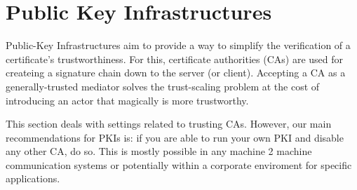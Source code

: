 \section{Public Key Infrastructures}

Public-Key Infrastructures aim to provide a way to simplify the verification of
a certificate's trustworthiness.  For this, certificate authorities (CAs) are
used for createing a signature chain down to the server (or client).  Accepting
a CA as a generally-trusted mediator solves the trust-scaling problem at the
cost of introducing an actor that magically is more trustworthy.

This section deals with settings related to trusting CAs.
However, our main recommendations for PKIs is: if you are able to run your own PKI and disable any other CA, do so.
This is mostly possible in any machine 2 machine communication systems or potentially within a corporate enviroment for specific applications.




